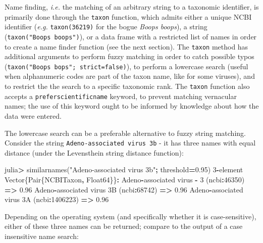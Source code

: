 \documentclass[10pt,oneside]{article}
\newenvironment{Shaded}{\begin{snugshade}}{\end{snugshade}}
\newcommand{\DataTypeTok}[1]{\textcolor[rgb]{0.13,0.29,0.53}{#1}}
\newcommand{\FloatTok}[1]{\textcolor[rgb]{0.00,0.00,0.81}{#1}}
\newcommand{\StringTok}[1]{\textcolor[rgb]{0.31,0.60,0.02}{#1}}
\newcommand{\OperatorTok}[1]{\textcolor[rgb]{0.81,0.36,0.00}{\textbf{#1}}}
\newcommand{\NormalTok}[1]{#1}
\begin{document}
Name finding, \emph{i.e.} the matching of an arbitrary string to a
taxonomic identifier, is primarily done through the \texttt{taxon}
function, which admits either a unique NCBI identifier (\emph{e.g.}
\texttt{taxon(36219)} for the bogue \emph{Boops boops}), a string
(\texttt{taxon("Boops\ boops")}), or a data frame with a restricted list
of names in order to create a name finder function (see the next
section). The \texttt{taxon} method has additional arguments to perform
fuzzy matching in order to catch possible typos
(\texttt{taxon("Boops\ bops";\ strict=false)}), to perform a lowercase
search (useful when alphanumeric codes are part of the taxon name, like
for some viruses), and to restrict the the search to a specific
taxonomic rank. The \texttt{taxon} function also accepts a
\texttt{preferscientificname} keyword, to prevent matching vernacular
names; the use of this keyword ought to be informed by knowledge about
how the data were entered.

The lowercase search can be a preferable alternative to fuzzy string
matching. Consider the string \texttt{Adeno-associated\ virus\ 3b} - it
has three names with equal distance (under the Levensthein string
distance function):

\begin{Shaded}
\begin{Highlighting}[]
\NormalTok{julia}\OperatorTok{\textgreater{}}\NormalTok{ similarnames(}\StringTok{"Adeno{-}associated virus 3b"}\OperatorTok{;}\NormalTok{ threshold}\OperatorTok{=}\FloatTok{0.95}\NormalTok{)}
\FloatTok{3}\OperatorTok{{-}}\NormalTok{element }\DataTypeTok{Vector}\NormalTok{\{}\DataTypeTok{Pair}\NormalTok{\{NCBITaxon}\OperatorTok{,} \DataTypeTok{Float64}\NormalTok{\}\}}\OperatorTok{:}
\NormalTok{  Adeno}\OperatorTok{{-}}\NormalTok{associated virus }\OperatorTok{{-}} \FloatTok{3}\NormalTok{ (ncbi}\OperatorTok{:}\FloatTok{46350}\NormalTok{) }\OperatorTok{=\textgreater{}} \FloatTok{0.96}
\NormalTok{   Adeno}\OperatorTok{{-}}\NormalTok{associated virus }\FloatTok{3}\NormalTok{B (ncbi}\OperatorTok{:}\FloatTok{68742}\NormalTok{) }\OperatorTok{=\textgreater{}} \FloatTok{0.96}
\NormalTok{ Adeno}\OperatorTok{{-}}\NormalTok{associated virus }\FloatTok{3}\NormalTok{A (ncbi}\OperatorTok{:}\FloatTok{1406223}\NormalTok{) }\OperatorTok{=\textgreater{}} \FloatTok{0.96}
\end{Highlighting}
\end{Shaded}

Depending on the operating system (and specifically whether it is
case-sensitive), either of these three names can be returned; compare to
the output of a case insensitive name search:
\end{document}
